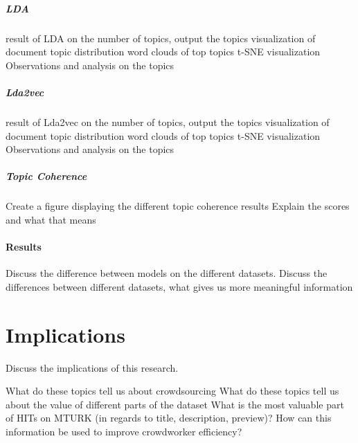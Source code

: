 \documentclass[letterpaper,12pt]{article}
\begin{document}
\paragraph{LDA}
result of LDA on the number of topics, output the topics
visualization of document topic distribution
word clouds of top topics
t-SNE visualization
Observations and analysis on the topics

\paragraph{Lda2vec}
result of Lda2vec on the number of topics, output the topics
visualization of document topic distribution
word clouds of top topics
t-SNE visualization
Observations and analysis on the topics

\paragraph{Topic Coherence}
Create a figure displaying the different topic coherence results
Explain the scores and what that means

\subsubsection{Results}
Discuss the difference between models on the different datasets.
Discuss the differences between different datasets, what gives us more meaningful information



\chapter{Implications}
Discuss the implications of this research.

What do these topics tell us about crowdsourcing
What do these topics tell us about the value of different parts of the dataset
What is the most valuable part of HITs on MTURK (in regards to title, description, preview)?
How can this information be used to improve crowdworker efficiency?
\end{document}
